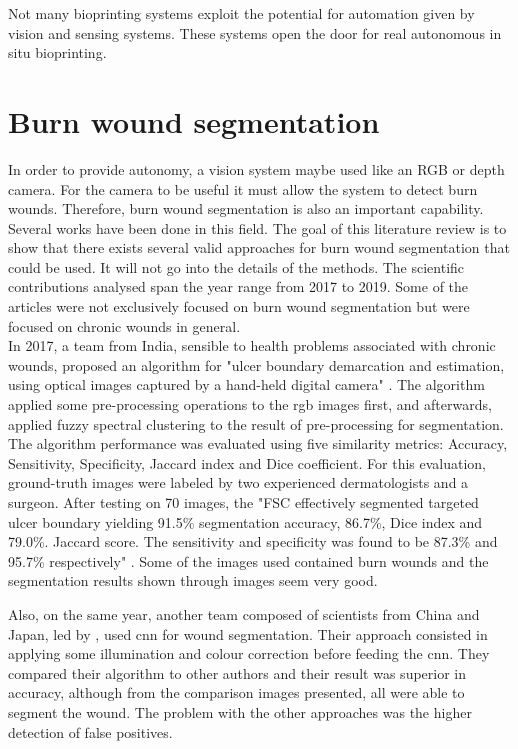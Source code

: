Not many bioprinting systems exploit the potential for automation given by vision and sensing systems. These systems open the door for real autonomous in situ bioprinting.


\section{Burn wound segmentation}
\label{sec:burn_wound_segmentation}

In order to provide autonomy, a vision system maybe used like an RGB or depth camera. For the camera to be useful it must allow the system to detect burn wounds. Therefore, burn wound segmentation is also an important capability. Several works have been done in this field. The goal of this literature review is to show that there exists several valid approaches for burn wound segmentation that could be used. It will not go into the details of the methods. The scientific contributions analysed span the year range from 2017 to 2019. Some of the articles were not exclusively focused on burn wound segmentation but were focused on chronic wounds in general.\\

In 2017, a team from India, sensible to health problems associated with chronic wounds, proposed an algorithm for "ulcer boundary demarcation and estimation, using optical images captured by a hand-held digital camera" \cite{ManoharDhane2017_fuzzy_spectral_clustering_chronic_wounds}. The algorithm applied some pre-processing operations to the \gls{rgb} images first, and afterwards, applied fuzzy spectral clustering to the result of pre-processing for segmentation. The algorithm performance was evaluated using five similarity metrics:
Accuracy, Sensitivity, Specificity, Jaccard index and Dice coefficient. For this evaluation, ground-truth images were labeled by two experienced dermatologists and a surgeon. After testing on 70 images, the "FSC effectively segmented targeted ulcer boundary yielding 91.5\% segmentation accuracy, 86.7\%, Dice index and 79.0\%. Jaccard score. The sensitivity and specificity was found to be 87.3\% and 95.7\% respectively" \cite{ManoharDhane2017_fuzzy_spectral_clustering_chronic_wounds}. Some of the images used contained burn wounds and the segmentation results shown through images seem very good.

Also, on the same year, another team composed of scientists from China and Japan, led by \citeauthor{Lu2017_wound_intensity_correction_segmentation_cnn}, used \gls{cnn} for wound segmentation. Their approach consisted in applying some illumination and colour correction before feeding the \gls{cnn}. They compared their algorithm to other authors and their result was superior in accuracy, although from the comparison images presented, all were able to segment the wound. The problem with the other approaches was the higher detection of false positives.\\


